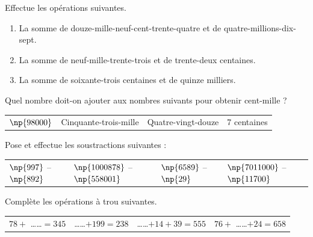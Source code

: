 \documentclass[a4paper,10pt]{report}
\begin{document}
\begin{ex}
Effectue les opérations suivantes.
\begin{enumerate}
\item La somme de douze-mille-neuf-cent-trente-quatre et de quatre-millions-dix-sept.
\item La somme de neuf-mille-trente-trois et de trente-deux centaines.
\item La somme de soixante-trois centaines et de quinze milliers.
\end{enumerate}
\end{ex}

\begin{ex}
Quel nombre doit-on ajouter aux nombres suivants pour obtenir cent-mille ?
\begin{enumerate}
\begin{tabular}{m{4cm}m{4cm}m{4cm}m{4cm}}
\item $\np{98 000}$&
\item Cinquante-trois-mille&
\item Quatre-vingt-douze&
\item 7 centaines\\
\end{tabular}
\end{enumerate}
\end{ex}

\begin{ex}
Pose et effectue les soustractions suivantes :
\begin{enumerate}
\begin{tabular}{m{4cm}m{4cm}m{4cm}m{4cm}}
\item $\np{997}$ – $\np{892}$&
\item $\np{1 000 878}$ – $\np{558 001}$&
\item $\np{6 589}$ – $\np{29}$&
\item $\np{7 011 000}$ – $\np{11 700}$\\
\end{tabular}
\end{enumerate}
\end{ex}

\begin{ex}
Complète les opérations à trou suivantes.
\begin{enumerate}
\begin{tabular}{m{4cm}m{4cm}m{4cm}m{4cm}}
\item $78 +$ \dots\dots  $= 345$&
\item \dots\dots  $+ 199 = 238$&
\item \dots\dots  $+ 14 + 39 = 555$&
\item $76 +$ \dots\dots  $+ 24 = 658$\\
\end{tabular}
\end{enumerate}
\end{ex}
\end{document}
